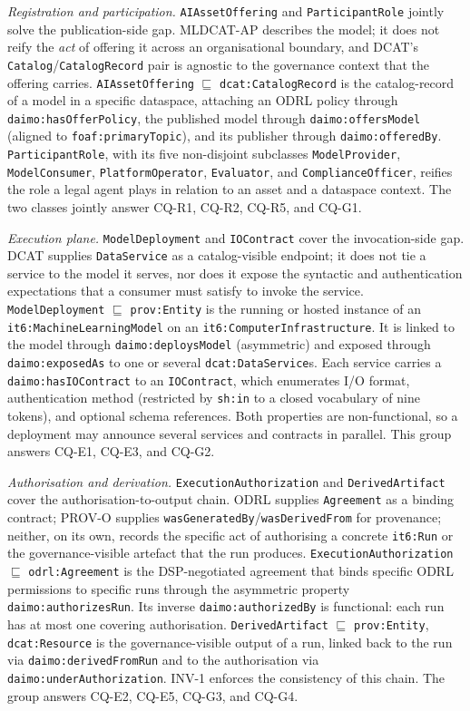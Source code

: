 \documentclass[Afour,sagev,times]{sagej}
\newcommand{\code}[1]{\texttt{#1}}
\begin{document}
\medskip\noindent\emph{Registration and participation.}
\code{AIAssetOffering} and \code{ParticipantRole} jointly solve the publication-side gap. MLDCAT-AP describes the model; it does not reify the \emph{act} of offering it across an organisational boundary, and DCAT's \code{Catalog}/\code{CatalogRecord} pair is agnostic to the governance context that the offering carries. \code{AIAssetOffering} $\sqsubseteq$ \code{dcat:CatalogRecord} is the catalog-record of a model in a specific dataspace, attaching an ODRL policy through \code{daimo:hasOfferPolicy}, the published model through \code{daimo:offersModel} (aligned to \code{foaf:primaryTopic}), and its publisher through \code{daimo:offeredBy}. \code{ParticipantRole}, with its five non-disjoint subclasses \code{ModelProvider}, \code{ModelConsumer}, \code{PlatformOperator}, \code{Evaluator}, and \code{ComplianceOfficer}, reifies the role a legal agent plays in relation to an asset and a dataspace context. The two classes jointly answer CQ-R1, CQ-R2, CQ-R5, and CQ-G1.

\medskip\noindent\emph{Execution plane.}
\code{ModelDeployment} and \code{IOContract} cover the invocation-side gap. DCAT supplies \code{DataService} as a catalog-visible endpoint; it does not tie a service to the model it serves, nor does it expose the syntactic and authentication expectations that a consumer must satisfy to invoke the service. \code{ModelDeployment} $\sqsubseteq$ \code{prov:Entity} is the running or hosted instance of an \code{it6:MachineLearningModel} on an \code{it6:ComputerInfrastructure}. It is linked to the model through \code{daimo:deploysModel} (asymmetric) and exposed through \code{daimo:exposedAs} to one or several \code{dcat:DataService}s. Each service carries a \code{daimo:hasIOContract} to an \code{IOContract}, which enumerates I/O format, authentication method (restricted by \code{sh:in} to a closed vocabulary of nine tokens), and optional schema references. Both properties are non-functional, so a deployment may announce several services and contracts in parallel. This group answers CQ-E1, CQ-E3, and CQ-G2.

\medskip\noindent\emph{Authorisation and derivation.}
\code{ExecutionAuthorization} and \code{DerivedArtifact} cover the authorisation-to-output chain. ODRL supplies \code{Agreement} as a binding contract; PROV-O supplies \code{wasGeneratedBy}/\code{wasDerivedFrom} for provenance; neither, on its own, records the specific act of authorising a concrete \code{it6:Run} or the governance-visible artefact that the run produces. \code{ExecutionAuthorization} $\sqsubseteq$ \code{odrl:Agreement} is the DSP-negotiated agreement that binds specific ODRL permissions to specific runs through the asymmetric property \code{daimo:authorizesRun}. Its inverse \code{daimo:authorizedBy} is functional: each run has at most one covering authorisation. \code{DerivedArtifact} $\sqsubseteq$ \code{prov:Entity}, \code{dcat:Resource} is the governance-visible output of a run, linked back to the run via \code{daimo:derivedFromRun} and to the authorisation via \code{daimo:underAuthorization}. INV-1 enforces the consistency of this chain. The group answers CQ-E2, CQ-E5, CQ-G3, and CQ-G4.
\end{document}
